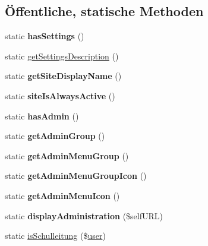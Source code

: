 \subsection*{Öffentliche, statische Methoden}
\begin{DoxyCompactItemize}
\item 
\mbox{\label{classschulinfo_a017c28f2943a2b260c515e4201a0addb}} 
static {\bfseries has\+Settings} ()
\item 
static \mbox{\hyperlink{classschulinfo_a14e41f9cafeb48e286092850a0a900fd}{get\+Settings\+Description}} ()
\item 
\mbox{\label{classschulinfo_aad53ed6837b869a9530e8c3906f005ae}} 
static {\bfseries get\+Site\+Display\+Name} ()
\item 
\mbox{\label{classschulinfo_a6636f637fb271f351fb715ba177c4f63}} 
static {\bfseries site\+Is\+Always\+Active} ()
\item 
\mbox{\label{classschulinfo_ad8affe50c5a0f5c7fe1f3062575f58f0}} 
static {\bfseries has\+Admin} ()
\item 
\mbox{\label{classschulinfo_a4a11418cf66769ef64976d2f0bd9d33f}} 
static {\bfseries get\+Admin\+Group} ()
\item 
\mbox{\label{classschulinfo_a539e28a42802778a05ec3baf578e17e6}} 
static {\bfseries get\+Admin\+Menu\+Group} ()
\item 
\mbox{\label{classschulinfo_a4bdcee8beb9936baed8f7e8b3050d9c6}} 
static {\bfseries get\+Admin\+Menu\+Group\+Icon} ()
\item 
\mbox{\label{classschulinfo_a66a930248776d5d003816e53a16fa357}} 
static {\bfseries get\+Admin\+Menu\+Icon} ()
\item 
\mbox{\label{classschulinfo_a82df0a3c85b8e9d74983ae8440cfa8f6}} 
static {\bfseries display\+Administration} (\$self\+U\+RL)
\item 
static \mbox{\hyperlink{classschulinfo_a0a2600d00aa9a5b7feaf5e69a7707821}{is\+Schulleitung}} (\$\mbox{\hyperlink{classuser}{user}})
\item 

\end{DoxyCompactItemize}
